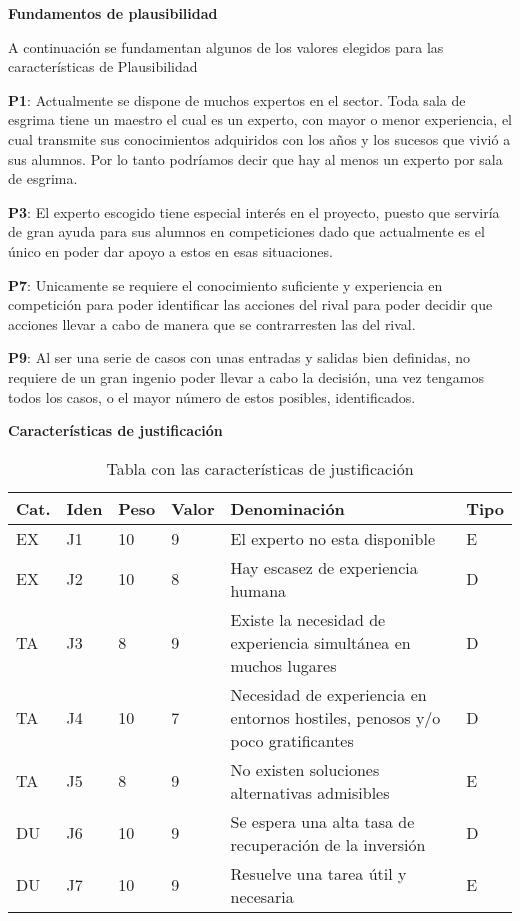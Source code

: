 \textbf{Fundamentos de plausibilidad}

A continuación se fundamentan algunos de los valores elegidos para las características de Plausibilidad


\begin{compactitem}
  \item[\textbf{P1}:] Actualmente se dispone de muchos expertos en el sector. Toda sala de esgrima
     tiene un maestro el cual es un experto, con mayor o menor experiencia, el cual transmite
     sus conocimientos adquiridos con los años y los sucesos que vivió a sus alumnos. Por lo tanto
     podríamos decir que hay al menos un experto por sala de esgrima.
  \item[\textbf{P3}:] El experto escogido tiene especial interés en el proyecto, puesto que
     serviría de gran ayuda para sus alumnos en competiciones dado que actualmente es el único
     en poder dar apoyo a estos en esas situaciones.
  \item[\textbf{P7}:] Unicamente se requiere el conocimiento suficiente y experiencia en competición
     para poder identificar las acciones del rival para poder decidir que acciones llevar a cabo
     de manera que se contrarresten las del rival.
  \item[\textbf{P9}:] Al ser una serie de casos con unas entradas y salidas bien definidas, no requiere
     de un gran ingenio poder llevar a cabo la decisión, una vez tengamos todos los casos, o el mayor
     número de estos posibles, identificados.
\end{compactitem}


\textbf{Características de justificación}
\begin{table}[htb]%
  \centering
  \caption{Tabla con las características de justificación}
  \label{tab:anchura}
  \begin{tabular}{ | l | l | l | l | p{8cm} | l | }
    \hline
    Cat. & Iden & Peso & Valor & Denominación & Tipo \\ \hline
    EX & J1 & 10 & 9 & El experto no esta disponible & E \\ \hline
    EX & J2 & 10 & 8 & Hay escasez de experiencia humana & D \\ \hline
    TA & J3 & 8 & 9 & Existe la necesidad de experiencia simultánea en muchos lugares & D \\ \hline
    TA & J4 & 10 & 7 & Necesidad de experiencia en entornos hostiles, penosos y/o poco gratificantes & D \\ \hline
    TA & J5 & 8 & 9 & No existen soluciones alternativas admisibles & E \\ \hline
    DU & J6 & 10 & 9 & Se espera una alta tasa de recuperación de la inversión & D \\ \hline
    DU & J7 & 10 & 9 & Resuelve una tarea útil y necesaria & E \\ \hline
   \end{tabular}
\end{table}

